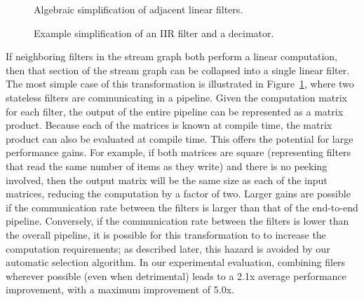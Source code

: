 \begin{figure}[t]
\caption{Algebraic simplification of adjacent linear filters.\protect\label{fig:combination}}
\end{figure}

\begin{figure}[t]
\caption{Example simplification of an IIR filter and a decimator.\protect\label{fig:combination-example}}
\end{figure}

If neighboring filters in the stream graph both perform a linear
computation, then that section of the stream graph can be collapsed
into a single linear filter.  The most simple case of this
transformation is illustrated in Figure~\ref{fig:combination}, where
two stateless filters are communicating in a pipeline.  Given the
computation matrix for each filter, the output of the entire pipeline
can be represented as a matrix product.  Because each of the matrices
is known at compile time, the matrix product can also be evaluated at
compile time.  This offers the potential for large performance gains.
For example, if both matrices are square (representing filters that
read the same number of items as they write) and there is no peeking
involved, then the output matrix will be the same size as each of the
input matrices, reducing the computation by a factor of two.  Larger
gains are possible if the communication rate between the filters is
larger than that of the end-to-end pipeline.  Conversely, if the
communication rate between the filters is lower than the overall
pipeline, it is possible for this transformation to to increase the
computation requirements; as described later, this hazard is avoided
by our automatic selection algorithm.  In our experimental evaluation,
combining filers wherever possible (even when detrimental) leads to a
2.1x average performance improvement, with a maximum improvement of
5.0x.

